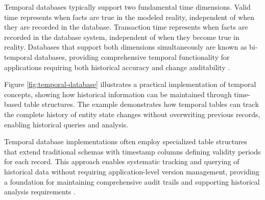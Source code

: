 Temporal databases typically support two fundamental time dimensions. Valid time represents when facts are true in the modeled reality, independent of when they are recorded in the database. Transaction time represents when facts are recorded in the database system, independent of when they become true in reality. Databases that support both dimensions simultaneously are known as bi-temporal databases, providing comprehensive temporal functionality for applications requiring both historical accuracy and change auditability \cite{kulkarni2012temporal}.

Figure \ref{fig:temporal-database} illustrates a practical implementation of temporal concepts, showing how historical information can be maintained through time-based table structures. The example demonstrates how temporal tables can track the complete history of entity state changes without overwriting previous records, enabling historical queries and analysis.

Temporal database implementations often employ specialized table structures that extend traditional schemas with timestamp columns defining validity periods for each record. This approach enables systematic tracking and querying of historical data without requiring application-level version management, providing a foundation for maintaining comprehensive audit trails and supporting historical analysis requirements \cite{salzberg1999comparison}.
